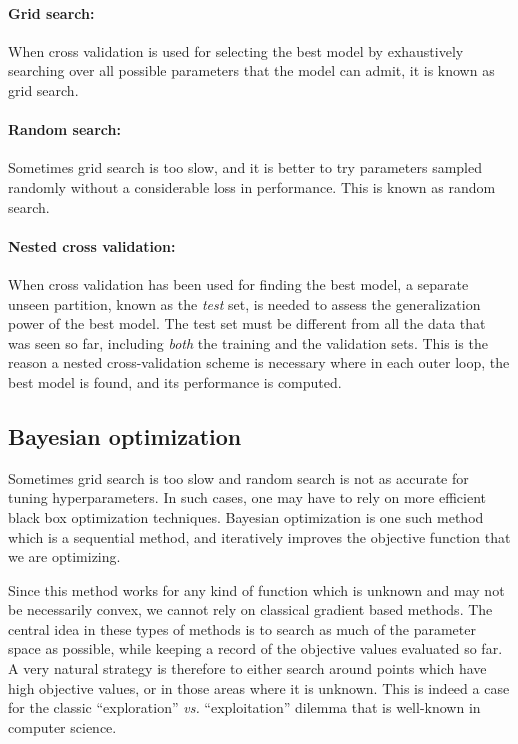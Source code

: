 \paragraph{Grid search: } When cross validation is used for selecting the best model by exhaustively searching over all possible parameters that the model can admit, it is known as grid search.

\paragraph{Random search: } Sometimes grid search is too slow, and it is better to try parameters sampled randomly without a considerable loss in performance. This is known as random search.

\paragraph{Nested cross validation: } When cross validation has been used for finding the best model, a separate unseen partition, known as the \emph{test} set, is needed to assess the generalization power of the best model. The test set must be different from all the data that was seen so far, including \emph{both} the training and the validation sets. This is the reason a nested cross-validation scheme is necessary where in each outer loop, the best model is found, and its performance is computed.

\subsection{Bayesian optimization}

Sometimes grid search is too slow and random search is not as accurate for tuning hyperparameters. In such cases, one may have to rely on more efficient black box optimization techniques. Bayesian optimization is one such method which is a sequential method, and iteratively improves the objective function that we are optimizing.

Since this method works for any kind of function which is unknown and may not be necessarily convex, we cannot rely on classical gradient based methods. The central idea in these types of methods is to search as much of the parameter space as possible, while keeping a record of the objective values evaluated so far. A very natural strategy is therefore to either search around points which have high objective values, or in those areas where it is unknown. This is indeed a case for the classic  ``exploration'' \emph{vs.} ``exploitation'' dilemma that is well-known in computer science.

